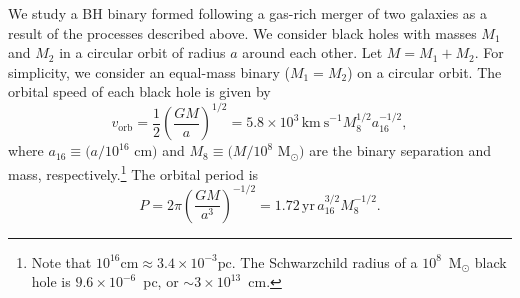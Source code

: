 \documentclass[a4paper,fleqn,usenatbib]{mnras}
\begin{document}
We study a BH binary formed following a gas-rich merger of two
galaxies as a result of the processes described above.  We consider
black holes with masses $M_1$ and $M_2$ in a circular orbit of radius
$a$ around each other.  Let $M=M_1+M_2$.  For simplicity, we consider
an equal-mass binary ($M_1=M_2$) on a circular orbit. The orbital
speed of each black hole is given by 
\begin{equation}
  v_\mathrm{orb} = \frac{1}{2}\left(\frac{GM}{a}\right)^{1/2}\!\!\!\! = 5.8\times 10^3\, \mathrm{km~s}^{-1}M_8^{1/2}a_{16}^{-1/2},
  \label{eqn:vorb}
\end{equation}
where $a_{16}\equiv (a/10^{16}$ cm$)$ and $M_8\equiv (M/10^8$
M$_\odot)$ are the binary separation and mass,
respectively.\footnote{Note that $10^{16} \mathrm{cm}\approx 3.4\times
  10^{-3} \mathrm{pc}$.  The Schwarzchild radius of a $10^8$~M$_\odot$
  black hole is $9.6\times 10^{-6}$~pc, or $\sim 3\times 10^{13}$~cm.}
The orbital period is
\begin{equation}
  P = 2\pi\left(\frac{GM}{a^3}\right)^{-1/2}\!\!\!\! = 1.72\, \mathrm{yr}\, a_{16}^{3/2} M_8^{-1/2}.
  \label{eqn:period}
\end{equation}
\end{document}
